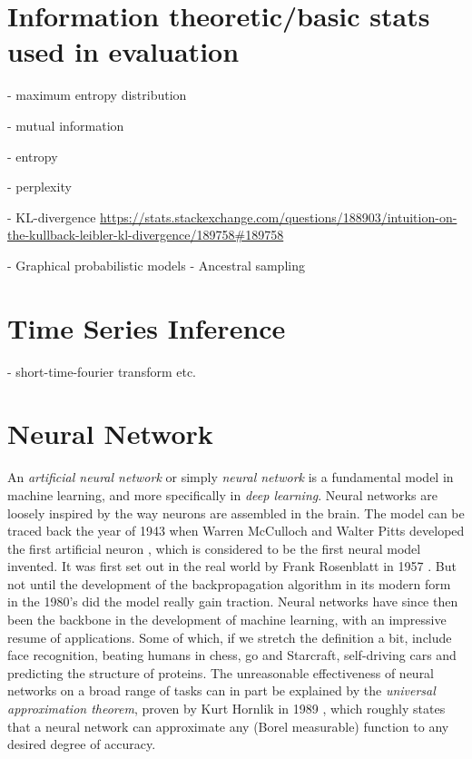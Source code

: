 \documentclass[../../thesis.tex]{subfiles}
\begin{document}



\section{Information theoretic/basic stats used in evaluation}

- maximum entropy distribution

- mutual information

- entropy

- perplexity

- KL-divergence
\url{https://stats.stackexchange.com/questions/188903/intuition-on-the-kullback-leibler-kl-divergence/189758#189758}

- Graphical probabilistic models 
    - Ancestral sampling

\section{Time Series Inference}
- short-time-fourier transform etc.

\section{Neural Network}
An \textit{artificial neural network} or simply \textit{neural network} is a fundamental model in machine learning, and more specifically in \textit{deep learning}. Neural networks are loosely inspired by the way neurons are assembled in the brain. The model can be traced back the year of 1943 when Warren McCulloch and Walter Pitts developed the first artificial neuron \cite{MCCULLOCH199099}, which is considered to be the first neural model invented. It was first set out in the real world by Frank Rosenblatt in 1957 \cite{rosenblatt1957perceptron}. But not until the development of the backpropagation algorithm in its modern form in the 1980's did the model really gain traction. Neural networks have since then been the backbone in the development of machine learning, with an impressive resume of applications. Some of which, if we stretch the definition a bit, include face recognition, beating humans in chess, go and Starcraft, self-driving cars and predicting the structure of proteins. The unreasonable effectiveness of neural networks on a broad range of tasks can in part be explained by the \textit{universal approximation theorem}, proven by Kurt Hornlik in 1989 \cite{HORNIK1989359}, which roughly states that a neural network can approximate any (Borel measurable) function to any desired degree of accuracy. 
\end{document}
